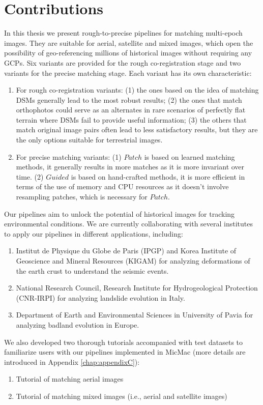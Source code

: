 \section{Contributions}
\label{sec:contributions}
In this thesis we present rough-to-precise pipelines for matching multi-epoch images. They are suitable for aerial, satellite and mixed images, which open the possibility of geo-referencing millions of historical images without requiring any \ac{GCP}s. 
Six variants are provided for the rough co-registration stage and two variants for the precise matching stage. Each variant has its own characteristic:\\
\begin{enumerate}
	\item For rough co-registration variants: (1) the ones based on the idea of matching \ac{DSM}s generally lead to the most robust results; (2) the ones that match orthophotos could serve as an alternates in rare scenarios of perfectly flat terrain where \ac{DSM}s fail to provide useful information; (3) the others that match original image pairs often lead to less satisfactory results, but they are the only options suitable for terrestrial images.
	\item For precise matching variants: (1) $Patch$ is based on learned matching methods, it generally results in more matches as it is more invariant over time. (2) $Guided$ is based on hand-crafted methods, it is more efficient in terms of the use of memory and CPU resources as it doesn't involve resampling patches, which is necessary for $Patch$. 
\end{enumerate}
\par
Our pipelines aim to unlock the potential of historical images for tracking environmental conditions. 
We are currently collaborating with several institutes to apply our pipelines in different applications, including:
\begin{enumerate}
	\item Institut de Physique du Globe de Paris (IPGP) and Korea Institute of Geoscience and Mineral Resources (KIGAM) for analyzing deformations of the earth crust to understand the seismic events.
	\item National Research Council, Research Institute for Hydrogeological Protection (CNR-IRPI) for analyzing landslide evolution in Italy.
	\item Department of Earth and Environmental Sciences in University of Pavia for analyzing badland evolution in Europe.
\end{enumerate}
\par
We also developed two thorough tutorials accompanied with test datasets to familiarize users with our pipelines implemented in MicMac\cite{HistoPcode} (more details are introduced in Appendix \ref{chap:appendixC}):
\begin{enumerate}
	\item Tutorial of matching aerial images \cite{tuto-aerial} 
	\item Tutorial of matching mixed images (i.e., aerial and satellite images) \cite{tuto-mixed} 
\end{enumerate}

